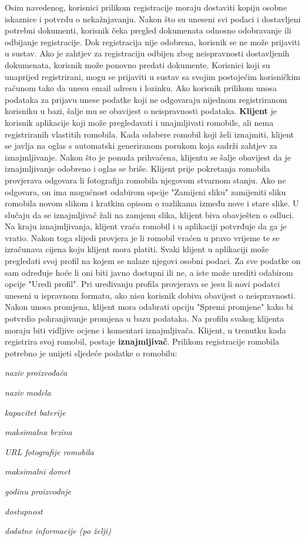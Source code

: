 		Osim navedenog, korisnici prilikom registracije moraju dostaviti kopiju osobne iskaznice i potvrdu o nekažnjavanju. Nakon što su uneseni svi podaci i dostavljeni potrebni dokumenti, korisnik čeka pregled dokumenata odnosno odobravanje ili odbijanje registracije. Dok registracija nije odobrena, korisnik se ne može prijaviti u sustav. Ako je zahtjev za registraciju odbijen zbog neispravnosti dostavljenih dokumenata, korisnik može ponovno predati dokumente. Korisnici koji su unaprijed registrirani, mogu se prijaviti u sustav sa svojim postojećim korisničkim računom tako da unesu email adresu i lozinku. Ako korisnik prilikom unosa podataka za prijavu unese podatke koji ne odgovaraju nijednom registriranom korisniku u bazi, šalje mu se obavijest o neispravnosti podataka. \textbf{Klijent} je korisnik aplikacije koji može pregledavati i unajmljivati romobile, ali nema registriranih vlastitih romobila. Kada odabere romobil koji želi iznajmiti, klijent se javlja na oglas s automatski generiranom porukom koja sadrži zahtjev za iznajmljivanje. Nakon što je ponuda prihvaćena, klijentu se šalje obavijest da je iznajmljivanje odobreno i oglas se briše. Klijent prije pokretanja romobila provjerava odgovara li fotografija romobila njegovom stvarnom stanju. Ako ne odgovara, on ima mogućnost odabirom opcije "Zamijeni sliku" zamijeniti sliku romobila novom slikom i kratkim opisom o razlikama između nove i stare slike. U slučaju da se iznajmljivač žali na zamjenu slika, klijent biva obavješten o odluci. Na kraju iznajmljivanja, klijent vraća romobil i u aplikaciji potvrđuje da ga je vratio. Nakon toga slijedi provjera je li romobil vraćen u pravo vrijeme te se izračunava cijena koju klijent mora platiti. Svaki klijent u aplikaciji može pregledati svoj profil na kojem se nalaze njegovi osobni podaci. Za sve podatke on sam određuje hoće li oni biti javno dostupni ili ne, a iste može urediti odabirom opcije "Uredi profil".  Pri uređivanju profila provjerava se jesu li novi podatci uneseni u ispravnom formatu, ako nisu korisnik dobiva obavijest o neispravnosti. Nakon unosa promjena, klijent mora odabrati opciju "Spremi promjene" kako bi potvrdio pohranjivanje promjena u bazu podataka. Na profilu svakog klijenta moraju biti vidljive ocjene i komentari iznajmljivača. Klijent, u trenutku kada registrira svoj romobil, postaje \textbf{iznajmljivač}. Prilikom registracije romobila potrebno je unijeti sljedeće podatke o romobilu: 
		
			\begin{packed_item}
			\item \textit{naziv proizvođača}
			\item \textit{naziv modela}
			\item \textit{kapacitet baterije}
			\item \textit{maksimalna brzina}
			\item \textit{URL fotografije romobila}
			\item \textit{maksimalni domet}
			\item \textit{godinu proizvodnje}
			\item \textit{dostupnost}
			\item \textit{dodatne informacije (po želji)}
			\end{packed_item}
			
